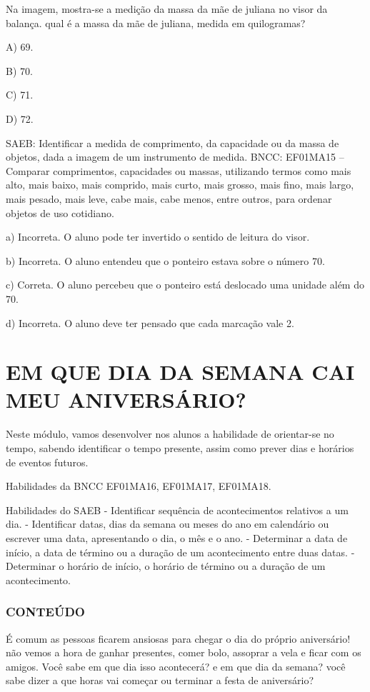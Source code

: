 Na imagem, mostra-se a medição da massa da mãe de juliana no visor da
balança. qual é a massa da mãe de juliana, medida em quilogramas?

A) 69.

B) 70.

C) 71.

D) 72.

SAEB: Identificar a medida de comprimento, da capacidade ou da
massa de objetos, dada a imagem de um instrumento de medida.
BNCC: EF01MA15 -- Comparar comprimentos, capacidades ou massas,
utilizando termos como mais alto, mais baixo, mais comprido, mais curto,
mais grosso, mais fino, mais largo, mais pesado, mais leve, cabe mais,
cabe menos, entre outros, para ordenar objetos de uso cotidiano.

a) Incorreta. O aluno pode ter invertido o sentido de leitura do visor.

b) Incorreta. O aluno entendeu que o ponteiro estava sobre o número 70.

c) Correta. O aluno percebeu que o ponteiro está deslocado uma unidade
além do 70.

d) Incorreta. O aluno deve ter pensado que cada marcação vale 2.

\chapter{EM QUE DIA DA SEMANA CAI MEU ANIVERSÁRIO?}

Neste módulo, vamos desenvolver nos alunos a habilidade de orientar-se no
tempo, sabendo identificar o tempo presente, assim como prever dias e
horários de eventos futuros.

Habilidades da BNCC
EF01MA16, EF01MA17, EF01MA18.

Habilidades do SAEB
- Identificar sequência de acontecimentos relativos a um dia.
- Identificar datas, dias da semana ou meses do ano em calendário ou
escrever uma data, apresentando o dia, o mês e o ano.
- Determinar a data de início, a data de término ou a duração de um
acontecimento entre duas datas.
- Determinar o horário de início, o horário de término ou a duração de
um acontecimento.

\subsection{CONTEÚDO}\label{conteuxfado-3}

É comum as pessoas ficarem ansiosas para chegar o dia do próprio aniversário!
não vemos a hora de ganhar presentes, comer bolo, assoprar a vela e
ficar com os amigos. Você sabe em que dia isso acontecerá? e em que dia
da semana? você sabe dizer a que horas vai começar ou terminar a 
festa de aniversário?

